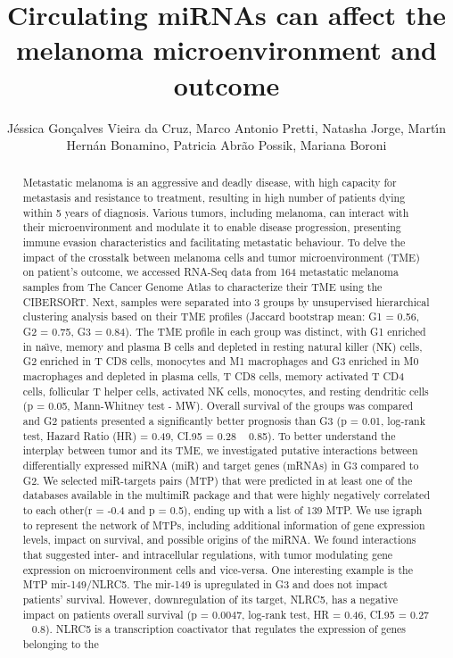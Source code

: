 \documentclass[twoside]{article}
\title{\vspace{-15mm}\fontsize{24pt}{10pt}\selectfont\textbf{ Circulating miRNAs can affect the melanoma microenvironment and outcome }} %
\author{ J\'essica Gon\c{c}alves Vieira da Cruz, Marco Antonio Pretti, Natasha Jorge, Mart\'{\i}n Hern\'an Bonamino, Patricia Abr\~ao Possik, Mariana Boroni }
\affil{ Laboratory of Functional Genomics and Bioinformatics,  Oswaldo Cruz Institute (IOC),  Oswaldo Cruz Foundation (Fiocruz),  Rio de Janeiro,  RJ,  Brazil. }
\date{}
\begin{document}
  
  
  \maketitle %
  
  
  \thispagestyle{fancy} %
  
  
  \begin{abstract}
  Metastatic melanoma is an aggressive and deadly disease,  with high capacity for metastasis and resistance to treatment,  resulting in high number of patients dying within 5 years of diagnosis. Various tumors,  including melanoma,  can interact with their microenvironment and modulate it to enable disease progression,  presenting immune evasion characteristics and facilitating metastatic behaviour. To delve the impact of the crosstalk between melanoma cells and tumor microenvironment (TME) on patient’s outcome,  we accessed RNA-Seq data from 164 metastatic melanoma samples from The Cancer Genome Atlas to characterize their TME using the CIBERSORT. Next,  samples were separated into 3 groups by unsupervised hierarchical clustering analysis based on their TME profiles (Jaccard bootstrap mean: G1 = 0.56,  G2 = 0.75,  G3 = 0.84). The TME profile in each group was distinct,  with G1 enriched in na\"{\i}ve,  memory and plasma B cells and depleted in resting natural killer (NK) cells,  G2 enriched in T CD8 cells,  monocytes and M1 macrophages and G3 enriched in M0 macrophages and depleted in plasma cells,  T CD8 cells,  memory activated T CD4 cells,  follicular T helper cells,  activated NK cells,  monocytes,  and resting dendritic cells (p = 0.05,  Mann-Whitney test - MW). Overall survival of the groups was compared and G2 patients presented a significantly better prognosis than G3 (p = 0.01,  log-rank test,  Hazard Ratio (HR) = 0.49,  CI.95 = 0.28 ~ 0.85). To better understand the interplay between tumor and its TME,  we investigated  putative interactions between differentially expressed miRNA (miR) and target genes (mRNAs) in G3 compared to G2. We selected miR-targets pairs (MTP) that were predicted in at least one of the databases available in the multimiR package and that were highly negatively correlated to each other(r = -0.4 and p = 0.5),  ending up with a list of 139 MTP. We use igraph to represent the network of MTPs,  including additional information of gene expression levels,  impact on survival,  and possible origins of the miRNA. We found interactions that suggested inter- and intracellular regulations,  with tumor modulating gene expression on microenvironment cells and vice-versa. One interesting example is the MTP mir-149/NLRC5. The mir-149 is upregulated in G3 and does not impact patients’ survival. However,  downregulation of its target,  NLRC5,  has a negative impact on patients overall survival (p = 0.0047,  log-rank test,  HR = 0.46,  CI.95 = 0.27 ~ 0.8). NLRC5 is a transcription coactivator that regulates the expression of genes belonging to the 
\end{abstract}
\end{document}
